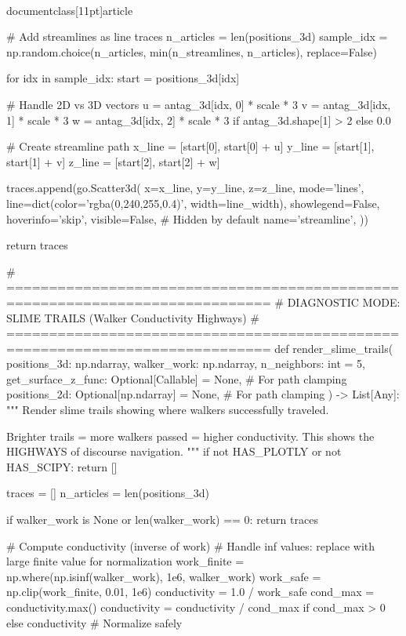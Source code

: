 \\documentclass[11pt]{article}
\begin{document}
\begin{CodeBlock}
{{    # Add streamlines as line traces
    n_articles = len(positions_3d)
    sample_idx = np.random.choice(n_articles, min(n_streamlines, n_articles), replace=False)

    for idx in sample_idx:
        start = positions_3d[idx]
        
        # Handle 2D vs 3D vectors
        u = antag_3d[idx, 0] * scale * 3
        v = antag_3d[idx, 1] * scale * 3
        w = antag_3d[idx, 2] * scale * 3 if antag_3d.shape[1] > 2 else 0.0

        # Create streamline path
        x_line = [start[0], start[0] + u]
        y_line = [start[1], start[1] + v]
        z_line = [start[2], start[2] + w]

        traces.append(go.Scatter3d(
            x=x_line, y=y_line, z=z_line,
            mode='lines',
            line=dict(color='rgba(0,240,255,0.4)', width=line_width),
            showlegend=False,
            hoverinfo='skip',
            visible=False,  # Hidden by default
            name='streamline',
        ))

    return traces


# =============================================================================
# DIAGNOSTIC MODE: SLIME TRAILS (Walker Conductivity Highways)
# =============================================================================
def render_slime_trails(
    positions_3d: np.ndarray,
    walker_work: np.ndarray,
    n_neighbors: int = 5,
    get_surface_z_func: Optional[Callable] = None, # For path clamping
    positions_2d: Optional[np.ndarray] = None,   # For path clamping
) -> List[Any]:
    """
    Render slime trails showing where walkers successfully traveled.

    Brighter trails = more walkers passed = higher conductivity.
    This shows the HIGHWAYS of discourse navigation.
    """
    if not HAS_PLOTLY or not HAS_SCIPY:
        return []

    traces = []
    n_articles = len(positions_3d)

    if walker_work is None or len(walker_work) == 0:
        return traces

    # Compute conductivity (inverse of work)
    # Handle inf values: replace with large finite value for normalization
    work_finite = np.where(np.isinf(walker_work), 1e6, walker_work)
    work_safe = np.clip(work_finite, 0.01, 1e6)
    conductivity = 1.0 / work_safe
    cond_max = conductivity.max()
    conductivity = conductivity / cond_max if cond_max > 0 else conductivity  # Normalize safely

}}
\end{CodeBlock}
\end{document}

